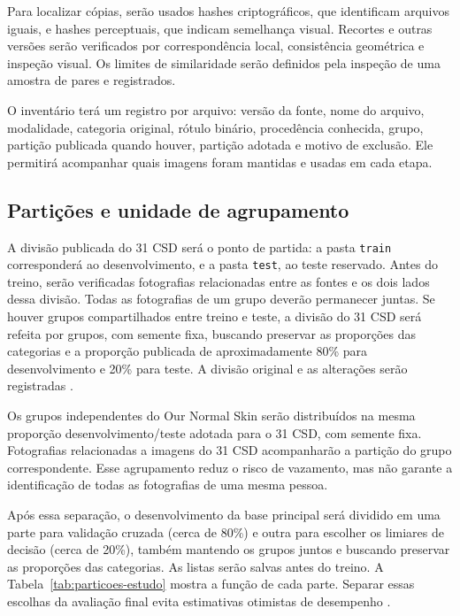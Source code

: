 Para localizar cópias, serão usados hashes criptográficos, que identificam
arquivos iguais, e hashes perceptuais, que indicam semelhança visual.
Recortes e outras versões serão verificados por correspondência local,
consistência geométrica e inspeção visual. Os limites de similaridade serão
definidos pela inspeção de uma amostra de pares e registrados.

O inventário terá um registro por arquivo: versão da fonte, nome do arquivo,
modalidade, categoria original, rótulo binário, procedência conhecida,
grupo, partição publicada quando houver, partição adotada e motivo de exclusão. Ele permitirá
acompanhar quais imagens foram mantidas e usadas em cada etapa.

\subsection{Partições e unidade de agrupamento}
\label{subsec:particoes}

A divisão publicada do 31 CSD será o ponto de partida: a pasta
\texttt{train} corresponderá ao desenvolvimento, e a pasta \texttt{test}, ao
teste reservado. Antes do treino, serão verificadas fotografias relacionadas
entre as fontes e os dois lados dessa divisão. Todas as fotografias de um
grupo deverão permanecer juntas. Se houver grupos compartilhados entre
treino e teste, a divisão do 31 CSD será refeita por grupos, com semente
fixa, buscando preservar as proporções das categorias e a proporção
publicada de aproximadamente 80\% para desenvolvimento e 20\% para teste.
A divisão original e as alterações serão registradas
\cite{kapoor2023,roberts2017,raschka2018}.

Os grupos independentes do Our Normal Skin serão distribuídos na mesma
proporção desenvolvimento/teste adotada para o 31 CSD, com semente fixa.
Fotografias relacionadas a imagens do 31 CSD acompanharão a partição do
grupo correspondente. Esse agrupamento reduz o risco de vazamento, mas não
garante a identificação de todas as fotografias de uma mesma pessoa.

Após essa separação, o desenvolvimento da base principal será dividido em
uma parte para validação cruzada (cerca de 80\%) e outra para escolher os
limiares de decisão (cerca de 20\%), também mantendo os grupos juntos e
buscando preservar as proporções das categorias. As listas serão salvas
antes do treino. A Tabela~\ref{tab:particoes-estudo} mostra a função de cada
parte. Separar essas escolhas da avaliação final evita estimativas otimistas
de desempenho \cite{varoquaux2023}.

